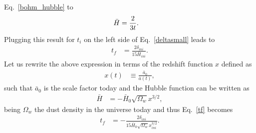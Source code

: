 \documentclass[a4paper,11pt]{article}
\begin{document}
Eq.~\eqref{bohm_hubble} to
\begin{align}
	\label{hubblefarbounce}
	\Bar{H} & = \frac{2}{3t}
	.\end{align}
Plugging this result for $t_i$ on the left side of Eq.~\eqref{deltasmall} leads to
\begin{align}
	\label{tf}
	t_f & = \frac{2\delta_{ini}}{15\bar{H}_{ini}}
	.\end{align}
Let us rewrite the above expression in terms of the redshift function $x$ defined as
\begin{align}
	x(t) & \equiv  \frac{\bar{a}_0}{\bar{a}(t)}
	,\end{align}
such that $\bar{a}_0$ is the scale factor today and the Hubble function can be written as
\begin{align}
	\label{Hx}
	\bar{H} & = -\bar{H}_0\sqrt{\Omega_w} x^{3/2}
	,\end{align}
being $\Omega_w$ the dust density in the universe today and thus Eq.~\eqref{tf} becomes
\begin{align}
	\label{tfx}
	t_f & = -\frac{2 \delta_{ini}}{15\bar{H}_0 \sqrt{\Omega_w} x_{ini}^{3/2}}
	.\end{align}
\end{document}
